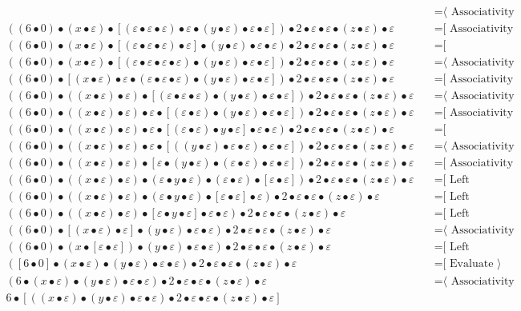 \documentclass{article}
\begin{document}
\begin{align*}
  & \quad \text{=⟨ Associativity ]}\\
((6 • 0) • (x • ε) • [(ε • ε • ε) • ε • (y • ε) • ε • ε]) • 2 • ε • ε • (z • ε) • ε
  & \quad \text{=[ Associativity ⟩}\\
((6 • 0) • (x • ε) • [(ε • ε • ε) • ε] • (y • ε) • ε • ε) • 2 • ε • ε • (z • ε) • ε
  & \quad \text{=[ Commutativity ⟩}\\
((6 • 0) • (x • ε) • [(ε • ε • ε • ε) • (y • ε) • ε • ε]) • 2 • ε • ε • (z • ε) • ε
  & \quad \text{=⟨ Associativity ]}\\
((6 • 0) • [(x • ε) • ε • (ε • ε • ε) • (y • ε) • ε • ε]) • 2 • ε • ε • (z • ε) • ε
  & \quad \text{=[ Associativity ⟩}\\
((6 • 0) • ((x • ε) • ε) • [(ε • ε • ε) • (y • ε) • ε • ε]) • 2 • ε • ε • (z • ε) • ε
  & \quad \text{=⟨ Associativity ]}\\
((6 • 0) • ((x • ε) • ε) • ε • [(ε • ε) • (y • ε) • ε • ε]) • 2 • ε • ε • (z • ε) • ε
  & \quad \text{=[ Associativity ⟩}\\
((6 • 0) • ((x • ε) • ε) • ε • [(ε • ε) • y • ε] • ε • ε) • 2 • ε • ε • (z • ε) • ε
  & \quad \text{=[ Commutativity ⟩}\\
((6 • 0) • ((x • ε) • ε) • ε • [((y • ε) • ε • ε) • ε • ε]) • 2 • ε • ε • (z • ε) • ε
  & \quad \text{=⟨ Associativity ]}\\
((6 • 0) • ((x • ε) • ε) • [ε • (y • ε) • (ε • ε) • ε • ε]) • 2 • ε • ε • (z • ε) • ε
  & \quad \text{=[ Associativity ⟩}\\
((6 • 0) • ((x • ε) • ε) • (ε • y • ε) • (ε • ε) • [ε • ε]) • 2 • ε • ε • (z • ε) • ε
  & \quad \text{=[ Left neutrality ⟩}\\
((6 • 0) • ((x • ε) • ε) • (ε • y • ε) • [ε • ε] • ε) • 2 • ε • ε • (z • ε) • ε
  & \quad \text{=[ Left neutrality ⟩}\\
((6 • 0) • ((x • ε) • ε) • [ε • y • ε] • ε • ε) • 2 • ε • ε • (z • ε) • ε
  & \quad \text{=[ Left neutrality ⟩}\\
((6 • 0) • [(x • ε) • ε] • (y • ε) • ε • ε) • 2 • ε • ε • (z • ε) • ε
  & \quad \text{=⟨ Associativity ]}\\
((6 • 0) • (x • [ε • ε]) • (y • ε) • ε • ε) • 2 • ε • ε • (z • ε) • ε
  & \quad \text{=[ Left neutrality ⟩}\\
([6 • 0] • (x • ε) • (y • ε) • ε • ε) • 2 • ε • ε • (z • ε) • ε
  & \quad \text{=[ Evaluate ⟩}\\
(6 • (x • ε) • (y • ε) • ε • ε) • 2 • ε • ε • (z • ε) • ε
  & \quad \text{=⟨ Associativity ]}\\
6 • [((x • ε) • (y • ε) • ε • ε) • 2 • ε • ε • (z • ε) • ε]

\end{align*}
\end{document}
